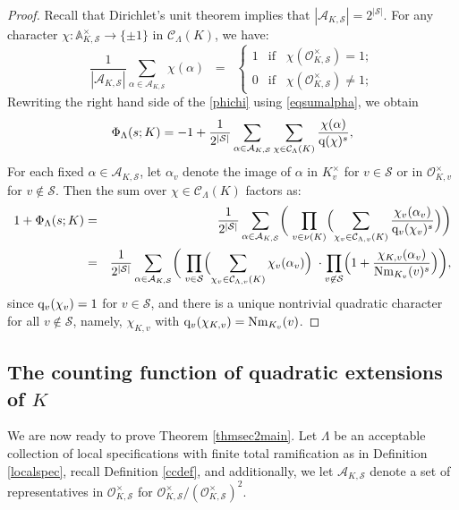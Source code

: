 \documentclass[10pt]{article}
\theoremstyle{plain}
\theoremstyle{definition}
\theoremstyle{remark}
\def\val{{\nu}}
\def\O{{\mathcal O}}
\def\cC{{\mathcal C}}
\def\cO{{\mathcal O}}
\def\cS{{\mathcal S}}
\newcommand{\A}{\mathbb{A}}
\newcommand{\q}{{\rm q}}
\newcommand{\cA}{{\mathcal A}}
\DeclareMathOperator{\Nm}{Nm}
\begin{document}
\begin{proof}
Recall that Dirichlet's unit theorem implies that $|\cA_{K,\cS}| =
2^{|\cS|}.$ For any character $\chi:\A_{K,\cS}^\times\to\{\pm 1\}$ in
$\cC_{\Lambda}(K)$, we have:
\begin{equation}\label{eqsumalpha}
\displaystyle\frac{1}{|\cA_{K,\cS}|}
\sum_{\alpha\in\cA_{K,\cS}}\chi(\alpha)\;\;=\;\;\left\{
\begin{array}{rl}
  1 &\mbox{if}\;\;\;\chi(\O_{K,\cS}^\times)=1;\\[.05in]
  0 &\mbox{if}\;\;\;\chi(\O_{K,\cS}^\times)\neq1;
\end{array}
\right.
\end{equation}
Rewriting the right hand side of the \eqref{phichi} using
\eqref{eqsumalpha}, we obtain
\begin{equation*}
  \Phi_{\Lambda}(s;K)=-1+
  \frac{1}{2^{|\cS|}}\sum_{\alpha\in\cA_{K,\cS}}
  \sum_{\chi \in \cC_{\Lambda}(K)}\frac{\chi(\alpha)}{\q(\chi)^s},
\end{equation*}
For each fixed $\alpha\in\cA_{K,\cS}$, let $\alpha_v$ denote the image of $\alpha$ in $K_v^\times$ for $v \in \cS$ or in $\cO_{K,v}^\times$ for $v \notin \cS$. Then the sum over $\chi \in
\cC_{\Lambda}(K)$ factors as:
\begin{eqnarray*}
  1+\Phi_{\Lambda}(s;K) &=& \frac{1}{2^{|\cS|}} \sum_{\alpha \in \cA_{K,\cS}}
  \biggl(\;\prod_{v \in \val(K)} \Bigl(\sum_{\chi_v \in \cC_{\Lambda,v}(K)}
  \frac{\chi_v(\alpha_v)}{\q_v(\chi_v)^s}\Bigr)\biggr)\\
&=&\frac{1}{2^{|\cS|}}
  \sum_{\alpha\in\cA_{K,\cS}}\biggl(\;\prod_{{v\in \cS}}
  \Bigl(\sum_{ \chi_v \in \cC_{\Lambda,v}(K)}
  \chi_v(\alpha_v)\Bigr)\;\cdot
  \prod_{v\not\in \cS}\Bigl(1+\frac{\chi_{K,v}(\alpha_v)}{\Nm_{K_v}(v)^s}\Bigr)
  \biggl),
\end{eqnarray*}
since $\q_v(\chi_v) = 1$ for $v \in \cS$, and there is a unique
nontrivial quadratic character for all $v \notin \cS$, namely, $\chi_{K,v}$ with $\q_v(\chi_{K,v}) = \Nm_{K_v}(v)$.
\end{proof}




\subsection{The counting function of quadratic extensions of $K$}\label{3.3}

We are now ready to prove Theorem \ref{thmsec2main}. Let
$\Lambda$ be an acceptable collection of local
specifications with finite total ramification as in Definition \ref{localspec}, recall Definition \ref{ccdef},
and additionally, we let
$\cA_{K,\cS}$ denote a set of representatives in $\O_{K,\cS}^\times$
for $\O_{K,\cS}^\times/(\O_{K,\cS}^{\times})^2$.
\end{document}
